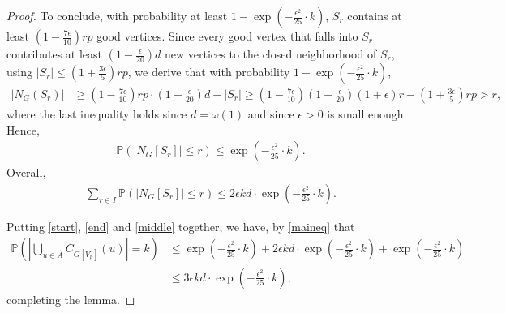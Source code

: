 \documentclass[10pt,a4paper]{amsart}
\begin{document}
\begin{proof}
    To conclude, with probability at least $1-\exp\left(-\frac{\epsilon^2}{25}\cdot k\right)$, $S_r$ contains at least $\left(1-\frac{7\epsilon}{10}\right)rp$ good vertices. Since every good vertex that falls into $S_r$ contributes at least $\left(1-\frac{\epsilon}{20}\right)d$ new vertices to the closed neighborhood of $S_r$, using $|S_r|\le \left(1+\frac{3\epsilon}{5}\right)rp$, we derive that with probability $1-\exp\left(-\frac{\epsilon^2}{25}\cdot k\right)$,
    \begin{align*}
        |N_G(S_r)|&\ge \left(1-\frac{7\epsilon}{10}\right)rp\cdot \left(1-\frac{\epsilon}{20}\right)d-|S_r|\ge \left(1-\frac{7\epsilon}{10}\right)\left(1-\frac{\epsilon}{20}\right)(1+\epsilon)r-\left(1+\frac{3\epsilon}{5}\right)rp>r,
    \end{align*}
    where the last inequality holds since $d=\omega(1)$ and since $\epsilon>0$ is small enough.
    Hence, 
    \begin{align*}
        \mathbb{P}\left(|N_G[S_r]|\le r\right)\le \exp\left(-\frac{\epsilon^2}{25}\cdot k\right).
    \end{align*}
    Overall,
    \begin{align}\label{middle}
        \sum_{r\in I}\mathbb{P}\left(|N_G[S_r]|\le r\right)\le 2\epsilon kd\cdot \exp\left(-\frac{\epsilon^2}{25}\cdot k\right).
    \end{align}
    
    Putting \eqref{start}, \eqref{end} and \eqref{middle} together, we have, by \eqref{maineq} that 
    \begin{align*}
        \mathbb{P}\left(\left|\bigcup_{u\in A} C_{G[V_p]}(u)\right|=k\right)
        &\le \exp\left(-\frac{\epsilon^2}{25}\cdot k\right) + 2\epsilon kd\cdot \exp\left(-\frac{\epsilon^2}{25}\cdot k\right) + \exp\left(-\frac{\epsilon^2}{25}\cdot k\right)\\
        &\le 3\epsilon kd\cdot \exp\left(-\frac{\epsilon^2}{25}\cdot k\right),
    \end{align*}
    completing the lemma.
\end{proof}
\end{document}
